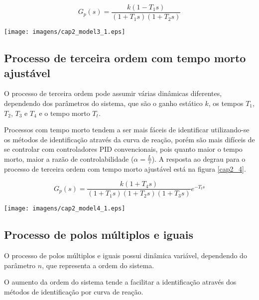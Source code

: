     \begin{equation}
        G_p(s) = \frac{k(1-T_1 s)}{(1+T_1 s)(1+T_2 s)}
    \end{equation}

    \begin{center}
        \texttt{[image: imagens/cap2\_model3\_1.eps]}
        \label{cap2_3}
    \end{center}

\subsection{Processo de terceira ordem com tempo morto ajustável}
    
    O processo de terceira ordem pode assumir várias dinâmicas diferentes, dependendo
    dos parâmetros do sistema, que são o ganho estático $k$, os tempos $T_1$, $T_2$,
    $T_3$ e $T_4$ e o tempo morto $T_t$.
    
    Processos com tempo morto tendem a ser mais fáceis de identificar utilizando-se
    os métodos de identificação através da curva de reação, porém são mais difíceis
    de se controlar com controladores \acs{PID} convencionais, pois quanto maior
    o tempo morto, maior a razão de controlabilidade ($\alpha = \frac{L}{\tau}$).
    A resposta ao degrau para o processo de terceira ordem com tempo morto ajustável
    está na figura \ref{cap2_4}.
    
    \begin{equation}
        G_p(s) = \frac{k(1+T_4 s)}{(1+T_1 s)(1+T_2 s)(1+T_3 s)} e^{-T_t s}
    \end{equation}
    
    \begin{center}
        \texttt{[image: imagens/cap2\_model4\_1.eps]}
        \label{cap2_4}
    \end{center}

\subsection{Processo de polos múltiplos e iguais}

    O processo de polos múltiplos e iguais possui dinâmica variável, dependendo
    do parâmetro $n$, que representa a ordem do sistema.
    
    O aumento da ordem do sistema tende a facilitar a identificação através dos
    métodos de identificação por curva de reação.
    
